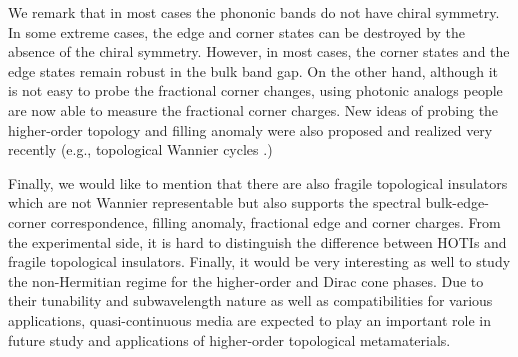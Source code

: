 \documentclass[doublecol]{epl2}
\begin{document}
We remark that in most cases the phononic bands do not have chiral symmetry. In some extreme cases, the edge and corner states can be destroyed by the absence of the chiral symmetry. However, in most cases, the corner states and the edge states remain robust in the bulk band gap. On the other hand, although it is not easy to probe the fractional corner changes, using photonic analogs people are now able to measure the fractional corner charges. New ideas of probing the higher-order topology and filling anomaly were also proposed and realized very recently (e.g., topological Wannier cycles \cite{lin2021experimental,lin2021topological}.)

Finally, we would like to mention that there are also fragile topological insulators which are not Wannier representable but also supports the spectral bulk-edge-corner correspondence, filling anomaly, fractional edge and corner charges. From the experimental side, it is hard to distinguish the difference between HOTIs and fragile topological insulators. Finally, it would be very interesting as well to study the non-Hermitian regime for the higher-order and Dirac cone phases. Due to their tunability and subwavelength nature as well as compatibilities for various applications, quasi-continuous media are expected to play an important role in future study and applications of higher-order topological metamaterials.


 \acknowledgments
\end{document}

